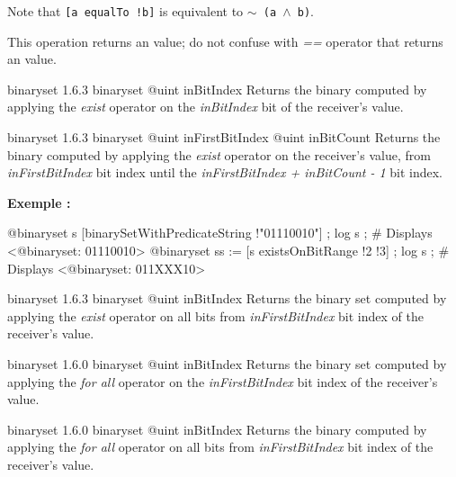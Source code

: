 Note that \texttt{[a equalTo !b]} is equivalent to \texttt{$\sim$ (a $\wedge$ b)}.

This operation returns an  value; do not confuse with \emph{==} operator that returns an  value.







{binaryset}
{1.6.3}
{binaryset}
{@uint inBitIndex}
{Returns the binary computed by applying the \emph{exist} operator on the \emph{inBitIndex} bit of the receiver's value.}
{}







{binaryset}
{1.6.3}
{binaryset}
{@uint inFirstBitIndex}
{@uint inBitCount}
{Returns the binary computed by applying the \emph{exist} operator on the receiver's value, from \emph{inFirstBitIndex} bit index until the \emph{inFirstBitIndex + inBitCount - 1} bit index.}
{}


\textbf{Exemple :}
\begin{galgascode}
@binaryset s [binarySetWithPredicateString !"01110010"] ;
log s ; # Displays <@binaryset: 01110010>
@binaryset ss := [s existsOnBitRange !2 !3] ;
log s ; # Displays <@binaryset: 011XXX10>
\end{galgascode}







{binaryset}
{1.6.3}
{binaryset}
{@uint inBitIndex}
{Returns the binary set computed by applying the \emph{exist} operator on all bits from \emph{inFirstBitIndex} bit index of the receiver's value.}
{}







{binaryset}
{1.6.0}
{binaryset}
{@uint inBitIndex}
{Returns the binary set computed by applying the \emph{for all} operator on the \emph{inFirstBitIndex} bit index of the receiver's value.}
{}







{binaryset}
{1.6.0}
{binaryset}
{@uint inBitIndex}
{Returns the binary computed by applying the \emph{for all} operator on all bits from \emph{inFirstBitIndex} bit index of the receiver's value.}
{}








